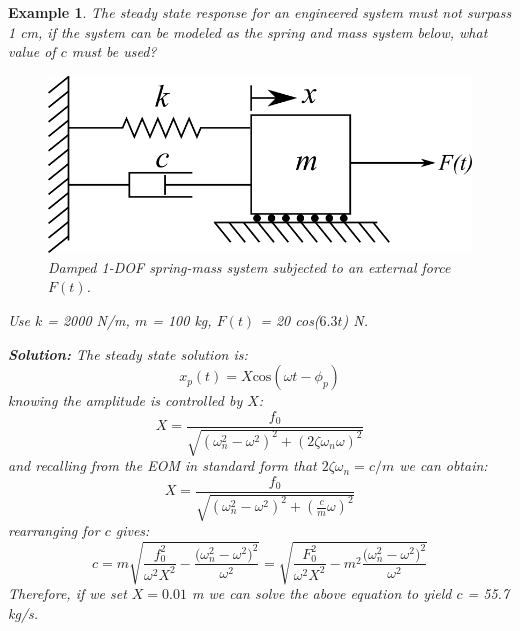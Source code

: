 \documentclass[12pt,letter]{article}
\newtheorem{ex}{Example}
\numberwithin{ex}{section} %
\newenvironment{example}{\begin{mdframed}[middlelinewidth=0.5mm]\begin{ex}\normalfont}{\end{ex}\end{mdframed}}
\numberwithin{re}{section} %
\begin{document}
\begin{example}

		

			The steady state response for an engineered system must not surpass 1 cm, if the system can be modeled as the spring and mass system below, what value of $c$ must be used?  
			\begin{figure}[H]
				\centering
				\includegraphics[]{../Figures/1-DOF-spring_dashpot_mass_horizontal_forced.png}
				\caption{Damped 1-DOF spring-mass system subjected to an external force $F(t)$.}
			\end{figure}	
			Use $k$ = 2000 N/m, $m$ = 100 kg, $F(t)$ = 20 cos($6.3t$) N. 			

			\noindent\textbf{Solution:} The steady state solution is:
			\begin{equation}
				x_p(t) = X \text{cos}(\omega t - \phi_p)
			\end{equation}			 
			knowing the amplitude is controlled by $X$: 
			\begin{equation}
				X = \frac{f_0}{\sqrt{(\omega_n^2 - \omega^2)^2 +  (2\zeta \omega_n \omega)^2}} 
			\end{equation}	
			and recalling from the EOM in standard form that $2\zeta \omega_n = c/m$ we can obtain:
			\begin{equation}
				X = \frac{f_0}{\sqrt{(\omega_n^2 - \omega^2)^2 +  (\frac{c}{m} \omega)^2}} 
			\end{equation}		
			rearranging for $c$ gives:		
			\begin{equation}
				c = m\sqrt{\frac{f_0^2}{\omega^2 X^2}-\frac{\big(\omega_n^2-\omega^2\big)^2}{\omega^2}} = \sqrt{\frac{F_0^2}{\omega^2 X^2}-m^2\frac{\big(\omega_n^2-\omega^2\big)^2}{\omega^2}} 
			\end{equation}
			Therefore, if we set $X=0.01$ m we can solve the above equation to yield $c$ = 55.7 kg/s.
			
\end{example}	
\end{document}
